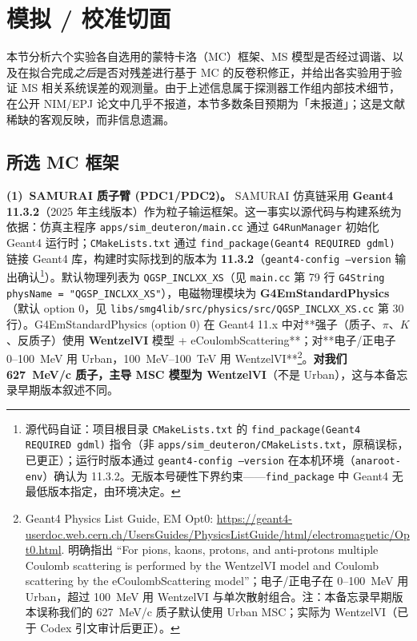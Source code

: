 \documentclass[a4paper, 11pt]{article}
\begin{document}
\section{模拟 / 校准切面}

本节分析六个实验各自选用的蒙特卡洛（MC）框架、MS 模型是否经过调谐、以及在拟合完成\emph{之后}是否对残差进行基于 MC 的反卷积修正，并给出各实验用于验证 MS 相关系统误差的观测量。由于上述信息属于探测器工作组内部技术细节，在公开 NIM/EPJ 论文中几乎不报道，本节多数条目预期为「未报道」；这是文献稀缺的客观反映，而非信息遗漏。

\subsection{所选 MC 框架}
\label{sec:mc_framework}

\textbf{(1)~SAMURAI 质子臂 (PDC1/PDC2)。}
SAMURAI 仿真链采用 \textbf{Geant4 11.3.2}（2025 年主线版本）作为粒子输运框架。这一事实以源代码与构建系统为依据：仿真主程序 \texttt{apps/sim\_deuteron/main.cc} 通过 \texttt{G4RunManager} 初始化 Geant4 运行时；\texttt{CMakeLists.txt} 通过 \texttt{find\_package(Geant4 REQUIRED gdml)} 链接 Geant4 库，构建时实际找到的版本为 \textbf{11.3.2}（\texttt{geant4-config --version} 输出确认\footnote{\label{fn:src_geant4_version}源代码自证：项目根目录 \texttt{CMakeLists.txt} 的 \texttt{find\_package(Geant4 REQUIRED gdml)} 指令（非 \texttt{apps/sim\_deuteron/CMakeLists.txt}，原稿误标，已更正）；运行时版本通过 \texttt{geant4-config --version} 在本机环境（\texttt{anaroot-env}）确认为 11.3.2。无版本号硬性下界约束——\texttt{find\_package} 中 Geant4 无最低版本指定，由环境决定。}）。默认物理列表为 \texttt{QGSP\_INCLXX\_XS}（见 \texttt{main.cc} 第 79 行 \texttt{G4String physName = "QGSP\_INCLXX\_XS"}），电磁物理模块为 \textbf{G4EmStandardPhysics}（默认 option 0，见 \texttt{libs/smg4lib/src/physics/src/QGSP\_INCLXX\_XS.cc} 第 30 行）。G4EmStandardPhysics (option 0) 在 Geant4 11.x 中对**强子（质子、$\pi$、$K$、反质子）使用 \textbf{WentzelVI} 模型 + eCoulombScattering**；对**电子/正电子 0--100~MeV 用 Urban，100~MeV--100~TeV 用 WentzelVI**\footnote{\label{fn:g4emstandard}Geant4 Physics List Guide, EM Opt0: \url{https://geant4-userdoc.web.cern.ch/UsersGuides/PhysicsListGuide/html/electromagnetic/Opt0.html}. 明确指出 ``For pions, kaons, protons, and anti-protons multiple Coulomb scattering is performed by the WentzelVI model and Coulomb scattering by the eCoulombScattering model''；电子/正电子在 0--100~MeV 用 Urban，超过 100~MeV 用 WentzelVI 与单次散射组合。注：本备忘录早期版本误称我们的 627~MeV/c 质子默认使用 Urban MSC；实际为 WentzelVI（已于 Codex 引文审计后更正）。}。\textbf{对我们 627~MeV/c 质子，主导 MSC 模型为 WentzelVI}（不是 Urban），这与本备忘录早期版本叙述不同。
\end{document}
